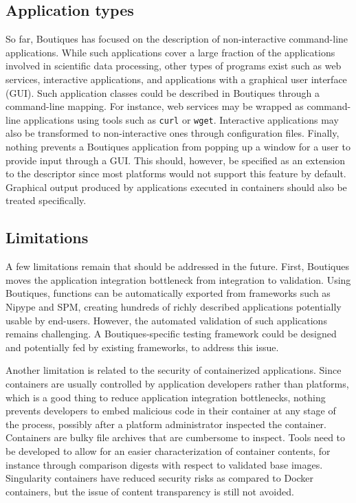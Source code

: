 \documentclass[a4paper,num-refs]{oup-contemporary}
\newcommand{\boutiques}{Boutiques\xspace}
\begin{document}
\subsection{Application types}

So far, \boutiques has focused on the description of non-interactive
command-line applications. While such applications cover a large
fraction of the applications involved in scientific data processing, other
types of programs exist such as web services, interactive applications, and
applications with a graphical user interface (GUI).  Such application
classes could be described in \boutiques through a command-line
mapping. For instance, web services may be wrapped as command-line
applications using tools such as \texttt{curl} or
\texttt{wget}. Interactive applications may also be transformed to
non-interactive ones through configuration files. Finally, nothing
prevents a \boutiques application from popping up a window for a user to
provide input through a GUI. This should, however, be specified
as an extension to the descriptor since most platforms would not support
this feature by default. Graphical output produced by applications
executed in containers should also be treated specifically.

\subsection{Limitations}

A few limitations remain that should be addressed in the
future. First, \boutiques moves the application integration bottleneck
from integration to validation. Using \boutiques, functions can be
automatically exported from frameworks such as Nipype and SPM,
creating hundreds of richly described applications potentially usable
by end-users. However, the automated validation of such applications
remains challenging. A \boutiques-specific testing framework could be
designed and potentially fed by existing frameworks, to address this
issue.

Another limitation is related to the security of containerized
applications. Since containers are usually controlled by application
developers rather than platforms, which is a good thing to reduce
application integration bottlenecks, nothing prevents developers to embed
malicious code in their container at any stage of the process,
possibly after a platform administrator inspected the
container. Containers are bulky file archives that are
cumbersome to inspect. Tools need to be developed to allow for an
easier characterization of container contents, for instance through
comparison digests with respect to validated base images. Singularity
containers have reduced security risks as compared to Docker containers,
but the issue of content transparency is still not avoided.
\end{document}
